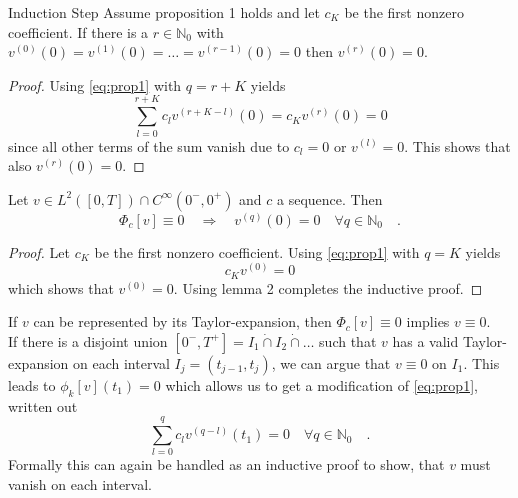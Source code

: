 \begin{lemma}{Induction Step}{}
	Assume proposition 1 holds and let $c_K$ be the first nonzero coefficient. 
	If there is a $r\in\mathbb{N}_0$ with $v^{(0)}(0)=
	v^{(1)}(0)=\ldots= v^{(r-1)}(0)=0$ then $v^{(r)}(0)=0$. 
\end{lemma}
\begin{proof}
	Using \eqref{eq:prop1} with $q = r+K$ yields 
	\begin{equation}
	\sum\limits_{l=0}^{r+K} c_l v^{(r+K-l)}(0) = c_K v^{(r)}(0) = 0
	\end{equation}
	since all other terms of the sum vanish due to $c_l=0$ or $v^{(l)}=0$. This shows 
	that also $v^{(r)}(0)=0$.
\end{proof}

\begin{theorem}{}{}
	Let $v\in L^2([0,T])\cap C^\infty(0^-,0^+)$ and $c$ a sequence. Then
	\begin{equation}
	\Phi_c[v] \equiv 0\quad  \Rightarrow\quad v^{(q)}(0) = 0
	 \quad \forall q\in\mathbb{N}_0 \quad .
	\end{equation}
\end{theorem}
\begin{proof}
	Let $c_K$ be the first nonzero coefficient. Using \eqref{eq:prop1} with $q=K$ yields 
	\begin{equation}
	c_K v^{(0)} = 0 
	\end{equation}
	which shows that $v^{(0)}=0$. Using lemma 2 completes the inductive proof.
\end{proof}

\begin{corollary}{}{}
	If $v$ can be represented by its Taylor-expansion, then $\Phi_c[v]\equiv 0$ implies 
	$v\equiv 0$.\\
	If there is a disjoint union $[0^-,T^+] = I_1\dot{\cap} I_2 \dot{\cap}\ldots$ such 
	that 
	$v$ has a valid Taylor-expansion on each interval $I_j=(t_{j-1},t_j)$, we can argue 
	that $v\equiv 0$ on $I_1$. This leads to $\phi_k[v](t_1)=0$ which allows us to get 
	a modification of \eqref{eq:prop1}, written out
	\begin{equation}
	\sum\limits_{l=0}^q c_l v^{(q-l)}(t_1) = 0 \quad \forall q \in \mathbb{N}_0 \quad .
	\end{equation}
	Formally this can again be handled as an inductive proof to show, that $v$ must 
	vanish on each interval.
\end{corollary}

